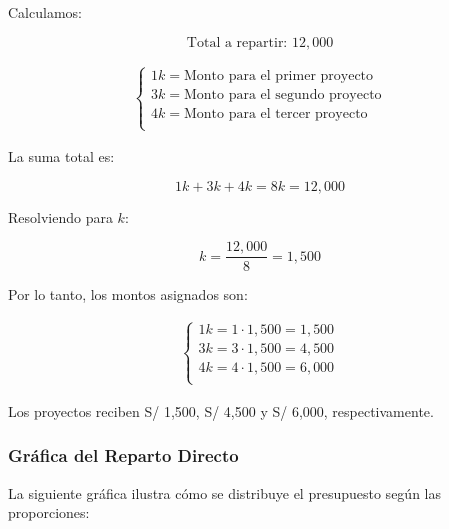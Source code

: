 \documentclass[
  stu,
  floatsintext,
  longtable,
  a4paper,
  nolmodern,
  notxfonts,
  notimes,
  12pt,
  colorlinks=true,linkcolor=blue,citecolor=blue,urlcolor=blue]{apa7}
\begin{document}
Calculamos:

\[
\text{Total a repartir: } 12,000
\]

\begin{align*}
\begin{cases}
1k = \text{Monto para el primer proyecto} \\
3k = \text{Monto para el segundo proyecto} \\
4k = \text{Monto para el tercer proyecto} \\
\end{cases}
\end{align*}

La suma total es:

\[
1k + 3k + 4k = 8k = 12,000
\]

Resolviendo para \(k\):

\[
k = \frac{12,000}{8} = 1,500
\]

Por lo tanto, los montos asignados son:

\begin{align*}
\begin{cases}
1k = 1 \cdot 1,500 = 1,500 \\
3k = 3 \cdot 1,500 = 4,500 \\
4k = 4 \cdot 1,500 = 6,000 \\
\end{cases}
\end{align*}

Los proyectos reciben S/ 1,500, S/ 4,500 y S/ 6,000, respectivamente.

\subsubsection{Gráfica del Reparto
Directo}\label{gruxe1fica-del-reparto-directo}

La siguiente gráfica ilustra cómo se distribuye el presupuesto según las
proporciones:
\end{document}
